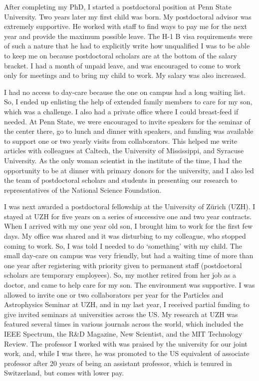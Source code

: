 \documentclass[utf8]{frontiersSCNS} %
\begin{document}
After completing my PhD, I started a postdoctoral position at Penn State University. Two years later my first child was born. My postdoctoral advisor was extremely supportive. He worked with staff to find ways to pay me for the next year and provide the maximum possible leave. The H-1 B visa requirements were of such a nature that he had to explicitly write how unqualified I was to be able to keep me on because postdoctoral scholars are at the bottom of the salary bracket. I had a month of unpaid leave, and was encouraged to come to work only for meetings and to bring my child to work. My salary was also increased.

I had no access to day-care because the one on campus had a long waiting list. So, I ended up enlisting the help of extended family members to care for my son, which was a challenge. I also had a private office where I could breast-feed if needed. At Penn State, we were encouraged to invite speakers for the seminar of the center there, go to lunch and dinner with speakers, and funding was available to support one or two yearly visits from collaborators. This helped me write articles with colleagues at Caltech, the University of Mississippi, and Syracuse University. As the only woman scientist in the institute of the time, I had the opportunity to be at dinner with primary donors for the university, and I also led the team of postdoctoral scholars and students in presenting our research to representatives of the National Science Foundation.

I was next awarded a postdoctoral fellowship at the University of Z\"{u}rich (UZH). I stayed at UZH for five years on a series of successive one and two year contracts. When I arrived with my one year old son, I brought him to work for the first few days. My office was shared and it was disturbing to my colleague, who stopped coming to work. So, I was told I needed to do `something' with my child.  The small day-care on campus was very friendly, but had a  waiting time of more than one year after registering with priority given to permanent staff (postdoctoral scholars are temporary employees). So, my mother retired from her job as a doctor, and came to help care for my son. The environment was supportive. I was allowed to invite one or two collaborators per year for the Particles and Astrophysics Seminar at UZH, and in my last year, I received partial funding to give invited seminars at universities across the US. My research at UZH was featured several times in various journals across the world, which included the IEEE Spectrum, the R\&D Magazine, New Scientist, and the MIT Technology Review. The professor I worked with was praised by the university for our joint work, and, while I was there, he was promoted to the US equivalent of associate professor after 20 years of being an assistant professor, which is tenured in Switzerland, but comes with lower pay. 
\end{document}
